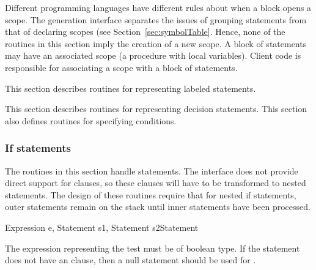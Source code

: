 Different programming languages have different rules about when a
block opens a scope.  The generation interface separates the issues of
grouping statements from that of declaring scopes (see
Section~\ref{sec:symbolTable}.  Hence, none of the routines in this
section imply the creation of a new scope.  A block of statements
may have an associated scope (\eg a procedure
with local variables).  Client code is responsible for
associating a scope with a block of statements.

\begin{functionality}
\end{functionality}

\label{sec:label}
This section describes routines for representing labeled statements.


\label{sec:cond}

This section describes routines for representing decision statements.
This section also defines routines for specifying conditions.  

\subsubsection{If statements}
The routines in this section handle  statements.  The
interface does not provide direct support for  clauses,
so these clauses will have to be transformed to nested 
statements.  The design of these routines require that for nested if
statements, outer  statements remain on the stack until inner
 statements have been processed.


	{Expression e, Statement s1, Statement s2}{Statement}
\begin{functionality}
The expression representing the test must be of boolean type.  If the
statement does not have an  clause, then a null statement
should be used for .
\end{functionality}

